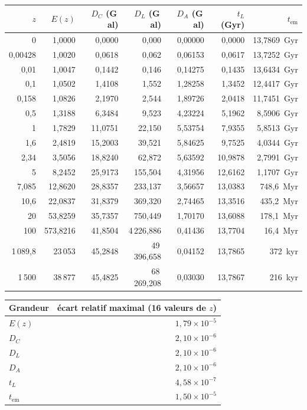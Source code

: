 \begin{center}
\footnotesize
\renewcommand{\arraystretch}{1.15}
\begin{tabular}{rrrrrrr}
\toprule
$z$ & $E(z)$ & $D_{C}$ (G\,al) & $D_{L}$ (G\,al) & $D_{A}$ (G\,al)
& $t_{L}$ (Gyr) & $t_{\text{em}}$ \\
\midrule
0 & 1{,}0000 & 0{,}0000 & 0{,}000 & 0{,}00000 & 0{,}0000 & 13{,}7869~Gyr \\
0{,}00428 & 1{,}0020 & 0{,}0618 & 0{,}062 & 0{,}06153 & 0{,}0617 & 13{,}7252~Gyr \\
0{,}01 & 1{,}0047 & 0{,}1442 & 0{,}146 & 0{,}14275 & 0{,}1435 & 13{,}6434~Gyr \\
0{,}1 & 1{,}0502 & 1{,}4108 & 1{,}552 & 1{,}28258 & 1{,}3452 & 12{,}4417~Gyr \\
0{,}158 & 1{,}0826 & 2{,}1970 & 2{,}544 & 1{,}89726 & 2{,}0418 & 11{,}7451~Gyr \\
0{,}5 & 1{,}3188 & 6{,}3484 & 9{,}523 & 4{,}23224 & 5{,}1962 & 8{,}5906~Gyr \\
1 & 1{,}7829 & 11{,}0751 & 22{,}150 & 5{,}53754 & 7{,}9355 & 5{,}8513~Gyr \\
1{,}6 & 2{,}4819 & 15{,}2003 & 39{,}521 & 5{,}84625 & 9{,}7525 & 4{,}0344~Gyr \\
2{,}34 & 3{,}5056 & 18{,}8240 & 62{,}872 & 5{,}63592 & 10{,}9878 & 2{,}7991~Gyr \\
5 & 8{,}2452 & 25{,}9173 & 155{,}504 & 4{,}31956 & 12{,}6162 & 1{,}1707~Gyr \\
7{,}085 & 12{,}8620 & 28{,}8357 & 233{,}137 & 3{,}56657 & 13{,}0383 & 748{,}6~Myr \\
10{,}6 & 22{,}0837 & 31{,}8379 & 369{,}320 & 2{,}74465 & 13{,}3516 & 435{,}2~Myr \\
20 & 53{,}8259 & 35{,}7357 & 750{,}449 & 1{,}70170 & 13{,}6088 & 178{,}1~Myr \\
100 & 573{,}8216 & 41{,}8504 & 4\,226{,}886 & 0{,}41436 & 13{,}7704 & 16{,}4~Myr \\
1\,089{,}8 & 23\,053 & 45{,}2848 & 49\,396{,}658 & 0{,}04152 & 13{,}7865 & 372~kyr \\
1\,500 & 38\,877 & 45{,}4825 & 68\,269{,}208 & 0{,}03030 & 13{,}7867 & 216~kyr \\
\bottomrule
\end{tabular}
\end{center}

\begin{center}
\renewcommand{\arraystretch}{1.25}
\begin{tabular}{lr}
\toprule
\textbf{Grandeur} & \textbf{écart relatif maximal (16 valeurs de $z$)} \\
\midrule
$E(z)$ & $1{,}79 \times 10^{-5}$ \\
$D_{C}$ & $2{,}10 \times 10^{-6}$ \\
$D_{L}$ & $2{,}10 \times 10^{-6}$ \\
$D_{A}$ & $2{,}10 \times 10^{-6}$ \\
$t_{L}$ & $4{,}58 \times 10^{-7}$ \\
$t_{\text{em}}$ & $1{,}50 \times 10^{-5}$ \\
\bottomrule
\end{tabular}
\end{center}

